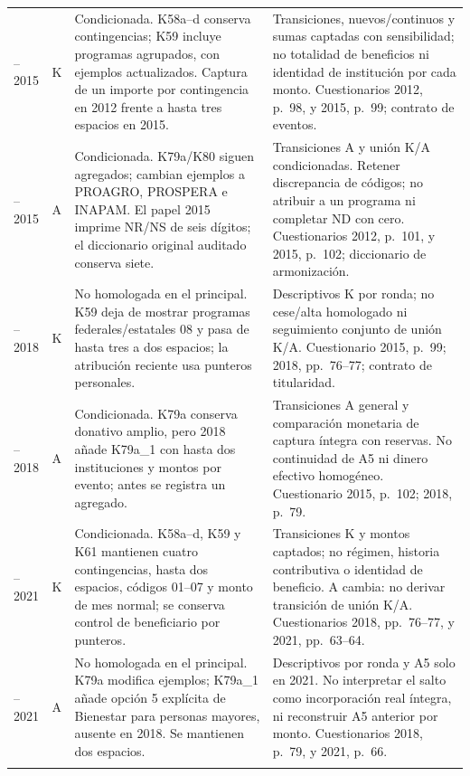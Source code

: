 \begin{longtable}{@{}>{\raggedright\arraybackslash}p{1.9cm}>{\raggedright\arraybackslash}p{.8cm}>{\raggedright\arraybackslash}p{6.1cm}>{\raggedright\arraybackslash}p{6.1cm}@{}}
\addlinespace[3pt]
2012--2015 & K & Condicionada. K58a--d conserva contingencias; K59 incluye programas agrupados, con ejemplos actualizados. Captura de un importe por contingencia en 2012 frente a hasta tres espacios en 2015. & Transiciones, nuevos/continuos y sumas captadas con sensibilidad; no totalidad de beneficios ni identidad de institución por cada monto. Cuestionarios 2012, p.~98, y 2015, p.~99; contrato de eventos. \\
\addlinespace[3pt]
2012--2015 & A & Condicionada. K79a/K80 siguen agregados; cambian ejemplos a PROAGRO, PROSPERA e INAPAM. El papel 2015 imprime NR/NS de seis dígitos; el diccionario original auditado conserva siete. & Transiciones A y unión K/A condicionadas. Retener discrepancia de códigos; no atribuir a un programa ni completar ND con cero. Cuestionarios 2012, p.~101, y 2015, p.~102; diccionario de armonización. \\
\addlinespace[3pt]
2015--2018 & K & No homologada en el principal. K59 deja de mostrar programas federales/estatales 08 y pasa de hasta tres a dos espacios; la atribución reciente usa punteros personales. & Descriptivos K por ronda; no cese/alta homologado ni seguimiento conjunto de unión K/A. Cuestionario 2015, p.~99; 2018, pp.~76--77; contrato de titularidad. \\
\addlinespace[3pt]
2015--2018 & A & Condicionada. K79a conserva donativo amplio, pero 2018 añade K79a\_1 con hasta dos instituciones y montos por evento; antes se registra un agregado. & Transiciones A general y comparación monetaria de captura íntegra con reservas. No continuidad de A5 ni dinero efectivo homogéneo. Cuestionario 2015, p.~102; 2018, p.~79. \\
\addlinespace[3pt]
2018--2021 & K & Condicionada. K58a--d, K59 y K61 mantienen cuatro contingencias, hasta dos espacios, códigos 01--07 y monto de mes normal; se conserva control de beneficiario por punteros. & Transiciones K y montos captados; no régimen, historia contributiva o identidad de beneficio. A cambia: no derivar transición de unión K/A. Cuestionarios 2018, pp.~76--77, y 2021, pp.~63--64. \\
\addlinespace[3pt]
2018--2021 & A & No homologada en el principal. K79a modifica ejemplos; K79a\_1 añade opción 5 explícita de Bienestar para personas mayores, ausente en 2018. Se mantienen dos espacios. & Descriptivos por ronda y A5 solo en 2021. No interpretar el salto como incorporación real íntegra, ni reconstruir A5 anterior por monto. Cuestionarios 2018, p.~79, y 2021, p.~66. \\
\addlinespace[3pt]
\end{longtable}
\endgroup
